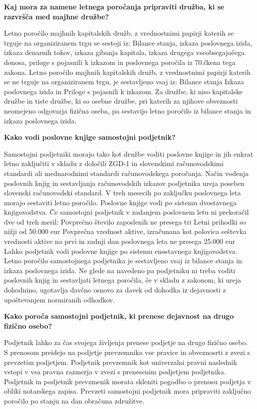 \documentclass[a4paper,12pt,openright]{book}
\begin{document}
\textbf{Kaj mora za namene letnega poročanja pripraviti družba, ki se razvršča med majhne družbe?}

Letno poročilo majhnih kapitalskih družb, z vrednostnimi papirji katerih se trguje na organiziranem trgu se sestoji iz:
Bilance stanja, izkaza poslovnega izida, izkaza denarnih tokov, izkaza gibanja kapitala, izkaza drugega vseobsegajočega donosa, priloge s pojasnili k izkazom in poslovnega poročila iz 70.čkena tega zakona.
Letno poročilo majhnih kapitalskih družb, z vrednostnimi papirji katerih se ne trguje na organiziranem trgu, je sestavljeno vsaj iz:
Bilance stanja
Izkaza poslovnega izida in
Priloge s pojasnili k izkazom.
Za družbe, ki niso kapitalske družbe in tiste družbe, ki so osebne družbe, pri katerih za njihove obveznosti neomejeno odgovarja fizična oseba, pa sestavijo letno poročilo iz bilance stanja in izkaza poslovnega izida.

\textbf{Kako vodi poslovne knjige samostojni podjetnik?}

Samostojni podjetniki morajo tako kot družbe voditi poslovne knjige in jih enkrat letno zaključiti v skladu z določili ZGD-1 in slovenskimi računovodskimi standardi ali mednarodnimi standardi računovodskega poročanja. Način vodenja poslovnih knjig in sestavljanja računovodskih izkazov podjetnika ureja poseben slovenski računovodski standard. V treh mesecih po zaključku poslovnega leta morajo sestaviti letno poročilo. Poslovne knjige vodi po sistemu dvostavnega knjigovodstva. Če samostojni podjetnik v zadanjem poslovnem letu ni prekoračil dve od treh meril:
Povprečno število zaposlenih ne presega tri
Letni prihodki so nižji od 50.000 eur
Povprečna vrednost aktive, izračunana kot polovica seštevka vrednosti aktive na prvi in zadnji dan poslovnega leta ne presega 25.000 eur
Lahko podjetnik vodi poslovne knjige po sistemu enostavnega knjigovodstva.
Letno poročilo samostojnega podjetnika je sestavljeno vsaj iz bilance stanja in izkaza poslovnega izida.
Ne glede na navedeno pa podjetniku ni treba voditi poslovnih knjig in sestavljati letnega poročila, če v skladu z zakonom, ki ureja dohodnino, ugotavlja davčno osnovo za davek od dohodka iz dejavnosti z upoštevanjem normiranih odhodkov.

\textbf{Kako poroča samostojni podjetnik, ki prenese dejavnost na drugo fizično osebo?}

Podjetnik lahko za čas svojega življenja prenese podjetje na drugo fizično osebo. S prenosom preidejo na podjetje prevzemnika vse pravice in obveznosrti z zvezi s prevzetim podjetjem. Podjetnik prevzemnik kot univerzalni pravni naslednik vstopi v vsa pravna razmerja v zvezi s prenesenim podjetjem podjetnika. Podjetnik in podjetnik prevzmenik morata skleniti pogodbo o prenosu podjetja v obliki notarskega zapisa.
Prevzeti samostojni podjetnik mora pripraviti zaključno poročilo po stanju na dan obračuna združitve.
\end{document}
